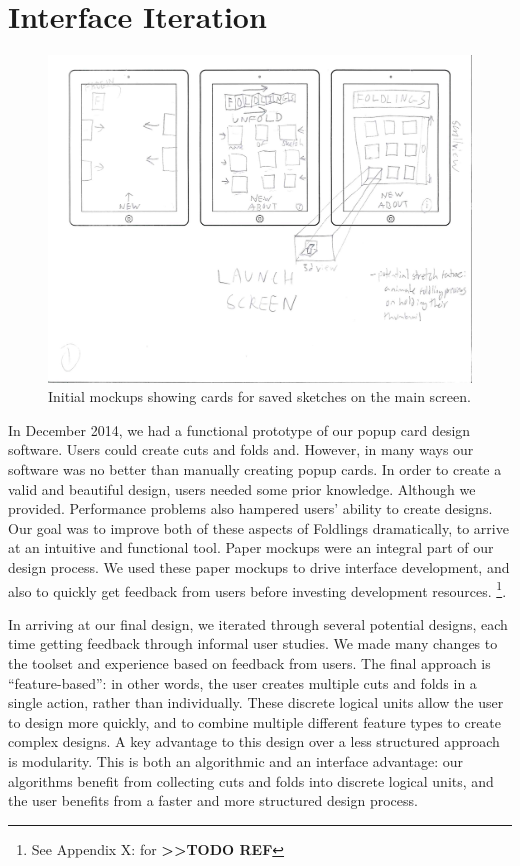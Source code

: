 \section{Interface Iteration}\label{interface-iteration}

\begin{figure}[htbp]
\centering
\includegraphics{figures/90_Appendix_UI_Mockups/001.png}
\caption{Initial mockups showing cards for saved sketches on the main
screen.}
\end{figure}

In December 2014, we had a functional prototype of our popup card design
software. Users could create cuts and folds and. However, in many ways
our software was no better than manually creating popup cards. In order
to create a valid and beautiful design, users needed some prior
knowledge. Although we provided. Performance problems also hampered
users' ability to create designs. Our goal was to improve both of these
aspects of Foldlings dramatically, to arrive at an intuitive and
functional tool. Paper mockups were an integral part of our design
process. We used these paper mockups to drive interface development, and
also to quickly get feedback from users before investing development
resources. \footnote{See Appendix X: for
  \textbf{\textgreater{}\textgreater{}TODO REF}}.

In arriving at our final design, we iterated through several potential
designs, each time getting feedback through informal user studies. We
made many changes to the toolset and experience based on feedback from
users. The final approach is ``feature-based'': in other words, the user
creates multiple cuts and folds in a single action, rather than
individually. These discrete logical units allow the user to design more
quickly, and to combine multiple different feature types to create
complex designs. A key advantage to this design over a less structured
approach is modularity. This is both an algorithmic and an interface
advantage: our algorithms benefit from collecting cuts and folds into
discrete logical units, and the user benefits from a faster and more
structured design process.

